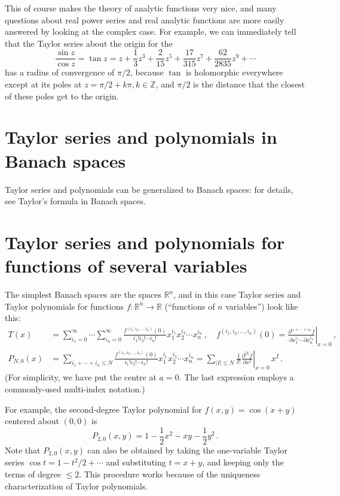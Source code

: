 \documentclass{article}
\newcommand{\real}{\mathbb{R}}
\providecommand{\abs}[1]{\lvert#1\rvert}
\begin{document}
This of course makes the theory of analytic functions very nice, and
many questions about real power series and real analytic functions are more easily  
answered by looking at the complex case.
For example, we can immediately tell that 
the Taylor series about the origin for the 
\[
\frac{\sin z}{\cos z} = \tan z = z+\frac{1}{3} z^3+\frac{2}{15}z^5+ \frac{17}{315}z^7+ \frac{62}{2835} z^9+ \dotsb
\]
has a radius of convergence of $\pi/2$,
because $\tan$ is holomorphic everywhere except at its poles at
$z = \pi/2 +k\pi, k \in \mathbb{Z}$, 
and $\pi/2$ is the distance that the closest of these poles get to the origin.

\section{Taylor series and polynomials in Banach spaces}
Taylor series and polynomials can be generalized to Banach spaces:
for details, see Taylor's formula in Banach spaces.

\section{Taylor series and polynomials for functions of several variables}
The simplest Banach spaces are the spaces $\real^n$,
and in this case Taylor series and Taylor polynomials for functions
$f \colon \real^n \to \real$ (``functions of $n$ variables'')
look like this:
\begin{align*}
 T(x) &= \sum_{i_1=0}^\infty \cdots \sum_{i_n=0}^\infty 
\frac{f^{(i_1,i_2,\ldots,i_n)}(0)}{i_1!i_2!\cdots i_n!}x_1^{i_1}x_2^{i_2} \cdots x_n^{i_n}
\,,
\quad
f^{(i_1,i_2,\ldots,i_n)}(0) = \left.\frac{\partial^{i_1+\dotsb+i_n} f}{\partial x_1^{i_1} \cdots \partial x_n^{i_n}}\right|_{x=0}\,,
\\
P_{N,0}(x) &= \sum_{i_1 + \dotsb + i_n  \leq N}
\frac{f^{(i_1, i_2, \ldots, i_n)}(0)}{i_1!i_2!\cdots i_n!}
  x_1^{i_1}x_2^{i_2} \cdots x_n^{i_n}  = \sum_{\abs{I} \leq N} \frac{1}{I!} \left.\frac{\partial^{\abs{I}} f}{\partial x^I}\right|_{x=0} \, x^I\,.
\end{align*}
(For simplicity, we have put the centre at $a= 0$. 
The last expression employs a commonly-used multi-index notation.)

For example, the second-degree Taylor polynomial for $f(x,y) = \cos(x+y)$
centered about $(0,0)$
is
\[
P_{2,0}(x,y) = 1 - \frac{1}{2} x^2  - xy -   \frac{1}{2}y^2\,.
\]
Note that $P_{2,0}(x,y)$ can also be obtained by
taking the one-variable Taylor series $\cos t = 1 - t^2 / 2 + \dotsb $ and substituting
$t = x+y$, and keeping only the terms of degree $\leq 2$.
This procedure works because of the uniqueness characterization of Taylor polynomials.
\end{document}
